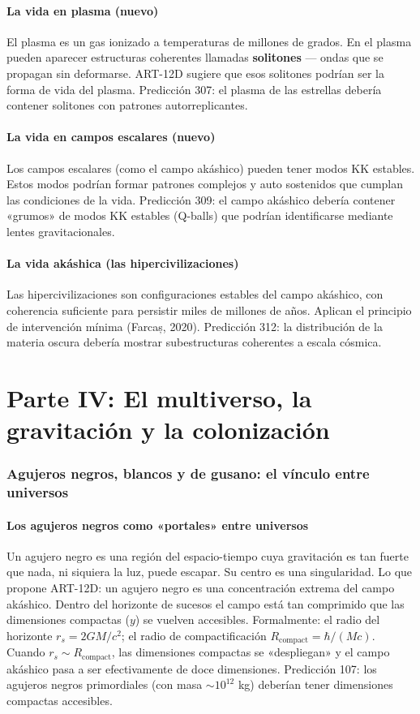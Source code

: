 \documentclass[11pt,a4paper]{article}
\begin{document}
\subsection{La vida en plasma (nuevo)}
El plasma es un gas ionizado a temperaturas de millones de grados. En el plasma pueden aparecer estructuras coherentes llamadas \textbf{solitones} --- ondas que se propagan sin deformarse. ART-12D sugiere que esos solitones podrían ser la forma de vida del plasma. Predicción 307: el plasma de las estrellas debería contener solitones con patrones autorreplicantes.

\subsection{La vida en campos escalares (nuevo)}
Los campos escalares (como el campo akáshico) pueden tener modos KK estables. Estos modos podrían formar patrones complejos y auto sostenidos que cumplan las condiciones de la vida. Predicción 309: el campo akáshico debería contener «grumos» de modos KK estables (Q-balls) que podrían identificarse mediante lentes gravitacionales.

\subsection{La vida akáshica (las hipercivilizaciones)}
Las hipercivilizaciones son configuraciones estables del campo akáshico, con coherencia suficiente para persistir miles de millones de años. Aplican el principio de intervención mínima (Farcaș, 2020). Predicción 312: la distribución de la materia oscura debería mostrar subestructuras coherentes a escala cósmica.

\newpage
\part*{Parte IV: El multiverso, la gravitación y la colonización}

\section{Agujeros negros, blancos y de gusano: el vínculo entre universos}
\subsection{Los agujeros negros como «portales» entre universos}
Un agujero negro es una región del espacio-tiempo cuya gravitación es tan fuerte que nada, ni siquiera la luz, puede escapar. Su centro es una singularidad. Lo que propone ART-12D: un agujero negro es una concentración extrema del campo akáshico. Dentro del horizonte de sucesos el campo está tan comprimido que las dimensiones compactas ($y$) se vuelven accesibles. Formalmente: el radio del horizonte $r_s = 2GM/c^2$; el radio de compactificación $R_{\text{compact}} = \hbar/(Mc)$. Cuando $r_s \sim R_{\text{compact}}$, las dimensiones compactas se «despliegan» y el campo akáshico pasa a ser efectivamente de doce dimensiones. Predicción 107: los agujeros negros primordiales (con masa $\sim 10^{12}$ kg) deberían tener dimensiones compactas accesibles.
\end{document}

